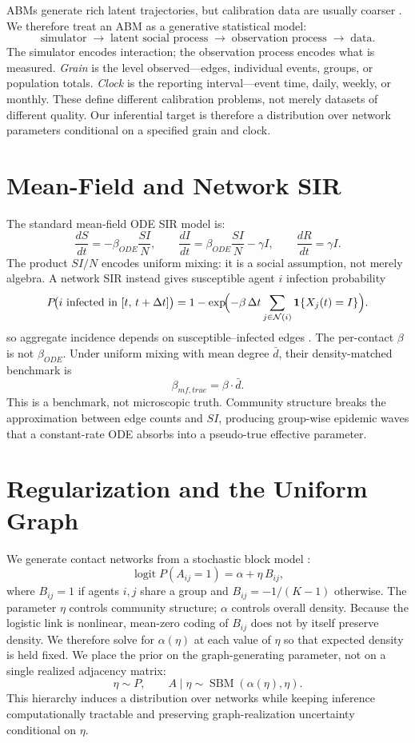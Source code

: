 \documentclass[11pt]{article}
\begin{document}
ABMs generate rich latent trajectories, but calibration data are usually coarser
\citep{epstein2008}. We therefore treat an ABM as a generative statistical model:
\[
\text{simulator} \;\to\; \text{latent social process} \;\to\; \text{observation process} \;\to\; \text{data.}
\]
The simulator encodes interaction; the observation process encodes what is measured.
\emph{Grain} is the level observed---edges, individual events, groups, or population
totals. \emph{Clock} is the reporting interval---event time, daily, weekly, or
monthly. These define different calibration problems, not merely datasets of
different quality. Our inferential target is therefore a distribution over network
parameters conditional on a specified grain and clock.

\section{Mean-Field and Network SIR}

The standard mean-field ODE SIR model \citep{kermack1927, keeling2008} is:
\[
\frac{dS}{dt} = -\beta_{ODE}\frac{SI}{N}, \qquad
\frac{dI}{dt} = \beta_{ODE}\frac{SI}{N} - \gamma I, \qquad
\frac{dR}{dt} = \gamma I.
\]
The product $SI/N$ encodes uniform mixing: it is a social assumption, not merely
algebra. A network SIR instead gives susceptible agent $i$ infection probability
\citep{keeling2008,kiss2017}
\[
P\!\bigl(i \text{ infected in } [t,\,t+\Delta t]\bigr)
= 1 - \exp\!\Bigl(-\beta\,\Delta t \sum_{j \in \mathcal{N}(i)} \mathbf{1}\{X_j(t)=I\}\Bigr).
\]
so aggregate incidence depends on susceptible--infected edges \citep{newman2002}.
The per-contact $\beta$ is not $\beta_{ODE}$. Under uniform mixing with mean degree
$\bar d$, their density-matched benchmark is
\[
\beta_{mf,true} = \beta \cdot \bar{d}.
\]
This is a benchmark, not microscopic truth. Community structure breaks the
approximation between edge counts and $SI$, producing group-wise epidemic waves
that a constant-rate ODE absorbs into a pseudo-true effective parameter.

\section{Regularization and the Uniform Graph}

We generate contact networks from a stochastic block model \citep{holland1983}:
\[
\operatorname{logit} P(A_{ij}=1) = \alpha + \eta\, B_{ij},
\]
where $B_{ij} = 1$ if agents $i,j$ share a group and $B_{ij} = -1/(K-1)$
otherwise. The parameter $\eta$ controls community structure; $\alpha$ controls
overall density. Because the logistic link is nonlinear, mean-zero coding of
$B_{ij}$ does not by itself preserve density. We therefore solve for
$\alpha(\eta)$ at each value of $\eta$ so that expected density is held fixed.
We place the prior on the graph-generating parameter, not on a single realized
adjacency matrix:
\[
  \eta \sim P, \qquad A\mid\eta \sim \operatorname{SBM}(\alpha(\eta),\eta).
\]
This hierarchy induces a distribution over networks while keeping inference
computationally tractable and preserving graph-realization uncertainty conditional
on $\eta$.
\end{document}
